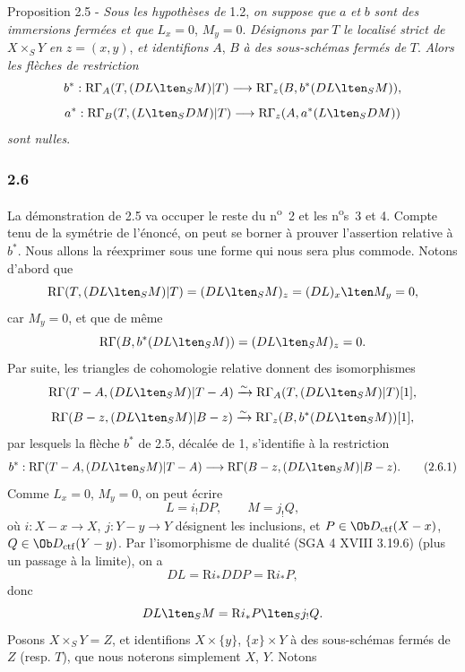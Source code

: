 \begin{statement}{Proposition 2.5 -}
\emph{Sous les hypothèses de} 1.2, \emph{on suppose que} $a$ \emph{et} $b$ \emph{sont des immersions fermées et que} $L_x=0$, $M_y=0$. \emph{Désignons par} $T$ \emph{le localisé strict de} $X\times_SY$ \emph{en} $z=(x,y)$, \emph{et identifions} $A$, $B$ \emph{à des sous-schémas fermés de} $T$. \emph{Alors les flèches de restriction}
\[
b^*:\mathrm{R}\Gamma_A(T,(DL\lten_SM)|T)
 \longrightarrow \mathrm{R}\Gamma_z(B,b^*(DL\lten_SM)),
\]
\[
a^*:\mathrm{R}\Gamma_B(T,(L\lten_SDM)|T)
 \longrightarrow \mathrm{R}\Gamma_z(A,a^*(L\lten_SDM))
\]
\emph{sont nulles}.
\end{statement}

\subsubsection*{2.6}
La démonstration de 2.5 va occuper le reste du n\textsuperscript{o}~2 et les n\textsuperscript{o}s~3 et 4. Compte tenu de la symétrie de l'énoncé, on peut se borner à prouver l'assertion relative à $b^*$. Nous allons la réexprimer sous une forme qui nous sera plus commode. Notons d'abord que
\[
\mathrm{R}\Gamma(T,(DL\lten_SM)|T)
 =(DL\lten_SM)_z
 =(DL)_x\lten M_y=0,
\]
car $M_y=0$, et que de même
\[
\mathrm{R}\Gamma(B,b^*(DL\lten_SM))
 =(DL\lten_SM)_z=0.
\]
Par suite, les triangles de cohomologie relative donnent des isomorphismes
\[
\mathrm{R}\Gamma(T-A,(DL\lten_SM)|T-A)
 \xrightarrow{\sim}
\mathrm{R}\Gamma_A(T,(DL\lten_SM)|T)[1],
\]
\[
\mathrm{R}\Gamma(B-z,(DL\lten_SM)|B-z)
 \xrightarrow{\sim}
\mathrm{R}\Gamma_z(B,b^*(DL\lten_SM))[1],
\]
par lesquels la flèche $b^*$ de 2.5, décalée de 1, s'identifie à la restriction
\begin{equation}
b^*:\mathrm{R}\Gamma(T-A,(DL\lten_SM)|T-A)
 \longrightarrow \mathrm{R}\Gamma(B-z,(DL\lten_SM)|B-z).
\tag{2.6.1}
\end{equation}
Comme $L_x=0$, $M_y=0$, on peut écrire
\begin{equation}
L=i_!DP,\qquad M=j_!Q,
\tag{2.6.2}
\end{equation}
où $i:X-x\to X$, $j:Y-y\to Y$
désignent les inclusions, et $P\in\Ob D_{\mathrm{ctf}}(X-x)$, $Q\in\Ob D_{\mathrm{ctf}}(Y-y)$. Par l'isomorphisme de dualité (SGA 4 XVIII 3.19.6) (plus un passage à la limite), on a
\[
DL=\mathrm{R} i_*DDP=\mathrm{R} i_*P,
\]
donc
\[
DL\lten_SM=\mathrm{R} i_*P\lten_Sj_!Q.
\]
Posons $X\times_SY=Z$, et identifions $X\times\{y\}$, $\{x\}\times Y$ à des sous-schémas fermés de $Z$ (resp. $T$), que nous noterons simplement $X$, $Y$. Notons
